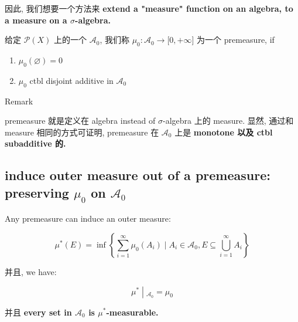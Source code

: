 因此, 我们想要一个方法来 \textbf{extend a "measure" function on an algebra, to a measure on a \(\sigma\)-algebra.}

\begin{definition}{}

给定 \(\mathcal{P}(X)\) 上的一个  \(\mathcal{A}_{0}\), 我们称 \(\mu_{0}:\mathcal{A}_{0}\rightarrow\lbrack 0, + \infty\rbrack\) 为一个 premeasure, if

\begin{enumerate}
\item
  \(\mu_{0}(\varnothing) = 0\)
\item
  \(\mu_{0}\) ctbl disjoint additive in \(\mathcal{A}_{0}\)
\end{enumerate}

\end{definition}

\begin{qlremark}{Remark}

premeasure 就是定义在 algebra instead of \(\sigma\)-algebra 上的 measure. 显然, 通过和 measure 相同的方式可证明, premeasure 在 \(\mathcal{A}_{0}\) 上是 \textbf{monotone 以及 ctbl subadditive 的.}

\end{qlremark}

\subsection{\texorpdfstring{induce outer measure out of a premeasure: preserving \(\mu_{0}\) on \(\mathcal{A}_{0}\)}{induce outer measure out of a premeasure: preserving \textbackslash mu\_\{0\} on \textbackslash mathcal\{A\}\_\{0\}}}\label{induce-outer-measure-out-of-a-premeasure-preserving-mu_0-on-mathcala_0}

\begin{proposition}{}\label{prop-02-outer-measure-completion-of-a-measurable-space-proposition-001}

Any premeasure can induce an outer measure:

\[\mu^{\ast}(E) = \inf\left\{ {\sum\limits_{i = 1}^{\infty}\mu_{0}(A_{i}) \mid A_{i} \in \mathcal{A}_{0},E \subseteq \bigcup\limits_{i = 1}^{\infty}A_{i}} \right\}\]

并且, we have:

\[\left. \mu^{\ast} \middle| {}_{\mathcal{A}_{0}} = \mu_{0} \right.\]

并且 \textbf{every set in \(\mathcal{A}_{0}\) is \(\mu^{\ast}\)-measurable.}

\end{proposition}

